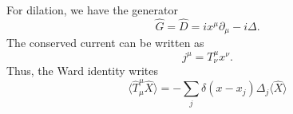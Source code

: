 \documentclass[a4paper,11pt]{article}
\begin{document}
For dilation, we have the generator 
\begin{equation}
    \hat{G}=\hat{D}=ix^\mu\partial_\mu-i\Delta.
\end{equation}
The conserved current can be written as
\begin{equation}
    j^\mu=T^{\mu}_\nu x^\nu.
\end{equation}
Thus, the Ward identity writes
\begin{equation}
    \langle\hat{T}^\mu_\mu\hat{X}\rangle=-\sum_j\delta(x-x_j)\Delta_j\langle\hat{X}\rangle
\end{equation}
\newpage
\begin{thebibliography}{99}







\end{thebibliography}
\end{document}
